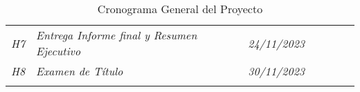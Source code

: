 \begin{longtable}[c]{llccrrrr}
	\textit{H7}                            & \textit{Entrega Informe final y Resumen Ejecutivo}                     & \multicolumn{2}{c}{\textit{24/11/2023}}          & \textit{}                                        & \textit{}                         & \textit{}                          & \textit{}                                                                  \\
	\textit{H8}                            & \textit{Examen de Título}                                              & \multicolumn{2}{c}{\textit{30/11/2023}}          & \textit{}                                        & \textit{}                         & \textit{}                          & \textit{}                                                                  \\ \hline
	\caption{Cronograma General del Proyecto}
	\label{tab:cronograma}                                                                                                                                                                                                                                                                                                                                                      \\
\end{longtable}
